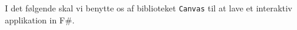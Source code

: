 I det følgende skal vi benytte os af biblioteket \texttt{Canvas} til at lave et interaktiv applikation in F\#.